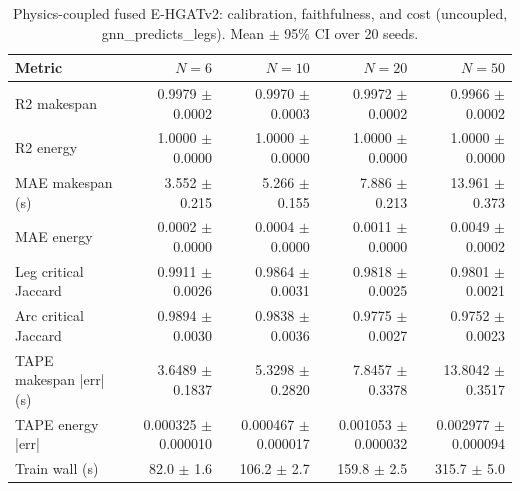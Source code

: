\begin{table}[t]
\centering
\caption{Physics-coupled fused E-HGATv2: calibration, faithfulness, and cost (uncoupled, gnn_predicts_legs). Mean $\pm$ 95\% CI over 20 seeds.}
\label{tab:fused-coupled}
\begin{tabular}{lrrrr}
\toprule
Metric & $N=6$ & $N=10$ & $N=20$ & $N=50$ \\
\midrule
R2 makespan & 0.9979 $\pm$ 0.0002 & 0.9970 $\pm$ 0.0003 & 0.9972 $\pm$ 0.0002 & 0.9966 $\pm$ 0.0002 \\
R2 energy & 1.0000 $\pm$ 0.0000 & 1.0000 $\pm$ 0.0000 & 1.0000 $\pm$ 0.0000 & 1.0000 $\pm$ 0.0000 \\
MAE makespan (s) & 3.552 $\pm$ 0.215 & 5.266 $\pm$ 0.155 & 7.886 $\pm$ 0.213 & 13.961 $\pm$ 0.373 \\
MAE energy & 0.0002 $\pm$ 0.0000 & 0.0004 $\pm$ 0.0000 & 0.0011 $\pm$ 0.0000 & 0.0049 $\pm$ 0.0002 \\
Leg critical Jaccard & 0.9911 $\pm$ 0.0026 & 0.9864 $\pm$ 0.0031 & 0.9818 $\pm$ 0.0025 & 0.9801 $\pm$ 0.0021 \\
Arc critical Jaccard & 0.9894 $\pm$ 0.0030 & 0.9838 $\pm$ 0.0036 & 0.9775 $\pm$ 0.0027 & 0.9752 $\pm$ 0.0023 \\
TAPE makespan |err| (s) & 3.6489 $\pm$ 0.1837 & 5.3298 $\pm$ 0.2820 & 7.8457 $\pm$ 0.3378 & 13.8042 $\pm$ 0.3517 \\
TAPE energy |err| & 0.000325 $\pm$ 0.000010 & 0.000467 $\pm$ 0.000017 & 0.001053 $\pm$ 0.000032 & 0.002977 $\pm$ 0.000094 \\
Train wall (s) & 82.0 $\pm$ 1.6 & 106.2 $\pm$ 2.7 & 159.8 $\pm$ 2.5 & 315.7 $\pm$ 5.0 \\
\bottomrule
\end{tabular}
\end{table}
